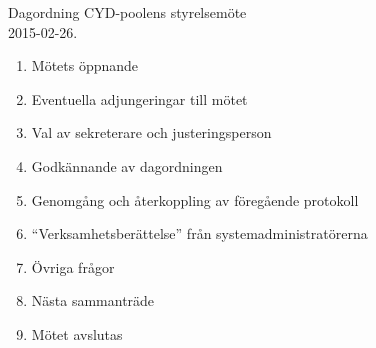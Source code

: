 \documentclass[a4paper,12pt,plain]{article}
\begin{document}
\LARGE
\noindent
Dagordning CYD-poolens styrelsemöte \\2015-02-26.
\\

\large

\begin{enumerate}
\item Mötets öppnande
\item Eventuella adjungeringar till mötet
\item Val av sekreterare och justeringsperson
\item Godkännande av dagordningen
\item Genomgång och återkoppling av föregående protokoll
\item ``Verksamhetsberättelse'' från systemadministratörerna
\item Övriga frågor
\item Nästa sammanträde
\item Mötet avslutas
\end{enumerate}
\end{document}
